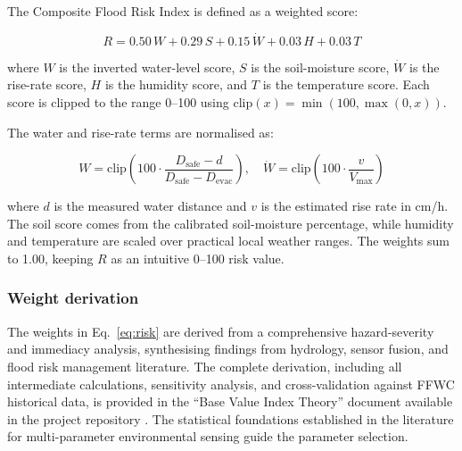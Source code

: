 \documentclass[5p,twocolumn]{elsarticle}
\begin{document}
The Composite Flood Risk Index is defined as a weighted score:

\begin{equation}
  R = 0.50\,W + 0.29\,S + 0.15\,\dot{W} + 0.03\,H + 0.03\,T
  \label{eq:risk}
\end{equation}

where $W$ is the inverted water-level score, $S$ is the soil-moisture score, $\dot{W}$ is the rise-rate score, $H$ is the humidity score, and $T$ is the temperature score. Each score is clipped to the range 0--100 using $\text{clip}(x) = \min(100, \max(0, x))$.

The water and rise-rate terms are normalised as:

\begin{equation}
  W = \text{clip}\left(100 \cdot \frac{D_{\text{safe}} - d}{D_{\text{safe}} - D_{\text{evac}}}\right), \quad
  \dot{W} = \text{clip}\left(100 \cdot \frac{v}{V_{\max}}\right)
  \label{eq:norm}
\end{equation}

where $d$ is the measured water distance and $v$ is the estimated rise rate in cm/h. The soil score comes from the calibrated soil-moisture percentage, while humidity and temperature are scaled over practical local weather ranges. The weights sum to 1.00, keeping $R$ as an intuitive 0--100 risk value.

\subsubsection{Weight derivation}

The weights in Eq.~\eqref{eq:risk} are derived from a comprehensive hazard-severity and immediacy analysis, synthesising findings from hydrology, sensor fusion, and flood risk management literature. The complete derivation, including all intermediate calculations, sensitivity analysis, and cross-validation against FFWC historical data, is provided in the ``Base Value Index Theory'' document available in the project repository \cite{usda2004,tangdamrongsub2021,kim2014,guo2026,verma2020,assouline2024}. The statistical foundations established in the literature for multi-parameter environmental sensing \cite{tao2024,mdegela2023} guide the parameter selection.
\end{document}
